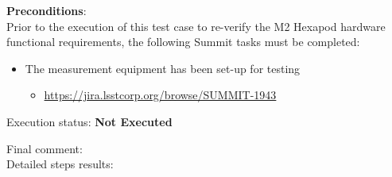 \documentclass[SE,lsstdraft,STR,toc]{lsstdoc}
\providecommand{\tightlist}{
  \setlength{\itemsep}{0pt}\setlength{\parskip}{0pt}}
\begin{document}
\textbf{ Preconditions}:\\
Prior to the execution of this test case to re-verify the M2 Hexapod
hardware functional requirements, the following Summit tasks must be
completed:

\begin{itemize}
\tightlist
\item
  The measurement equipment has been set-up for testing

  \begin{itemize}
  \tightlist
  \item
    \url{https://jira.lsstcorp.org/browse/SUMMIT-1943}
  \end{itemize}
\end{itemize}

Execution status: {\bf Not Executed }

Final comment:\\


Detailed steps results:
\end{document}
